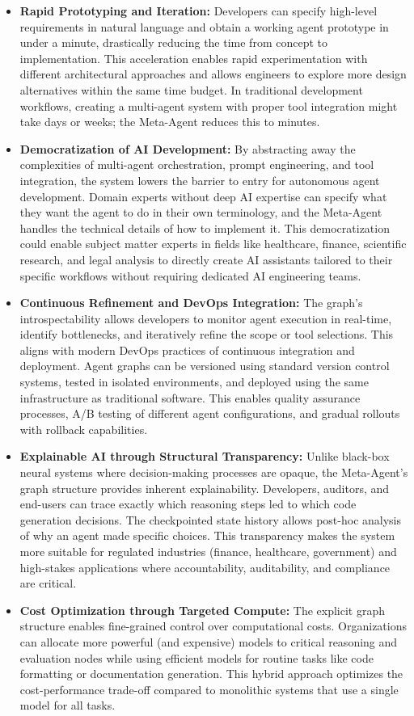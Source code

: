 \documentclass[lettersize,journal]{IEEEtran}
\begin{document}
\begin{itemize}
    \item \textbf{Rapid Prototyping and Iteration:} Developers can specify high-level requirements in natural language and obtain a working agent prototype in under a minute, drastically reducing the time from concept to implementation. This acceleration enables rapid experimentation with different architectural approaches and allows engineers to explore more design alternatives within the same time budget. In traditional development workflows, creating a multi-agent system with proper tool integration might take days or weeks; the Meta-Agent reduces this to minutes.
    \item \textbf{Democratization of AI Development:} By abstracting away the complexities of multi-agent orchestration, prompt engineering, and tool integration, the system lowers the barrier to entry for autonomous agent development. Domain experts without deep AI expertise can specify what they want the agent to do in their own terminology, and the Meta-Agent handles the technical details of how to implement it. This democratization could enable subject matter experts in fields like healthcare, finance, scientific research, and legal analysis to directly create AI assistants tailored to their specific workflows without requiring dedicated AI engineering teams.
    \item \textbf{Continuous Refinement and DevOps Integration:} The graph's introspectability allows developers to monitor agent execution in real-time, identify bottlenecks, and iteratively refine the scope or tool selections. This aligns with modern DevOps practices of continuous integration and deployment. Agent graphs can be versioned using standard version control systems, tested in isolated environments, and deployed using the same infrastructure as traditional software. This enables quality assurance processes, A/B testing of different agent configurations, and gradual rollouts with rollback capabilities.
    \item \textbf{Explainable AI through Structural Transparency:} Unlike black-box neural systems where decision-making processes are opaque, the Meta-Agent's graph structure provides inherent explainability. Developers, auditors, and end-users can trace exactly which reasoning steps led to which code generation decisions. The checkpointed state history allows post-hoc analysis of why an agent made specific choices. This transparency makes the system more suitable for regulated industries (finance, healthcare, government) and high-stakes applications where accountability, auditability, and compliance are critical.
    \item \textbf{Cost Optimization through Targeted Compute:} The explicit graph structure enables fine-grained control over computational costs. Organizations can allocate more powerful (and expensive) models to critical reasoning and evaluation nodes while using efficient models for routine tasks like code formatting or documentation generation. This hybrid approach optimizes the cost-performance trade-off compared to monolithic systems that use a single model for all tasks.
\end{itemize}
\end{document}
